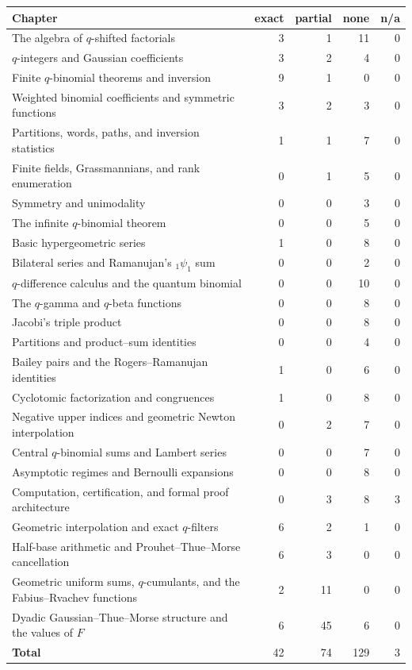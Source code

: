 \documentclass[11pt,a4paper,oneside,openany]{book}
\theoremstyle{definition}
\theoremstyle{remark}
\newcommand{\statusexact}{\textsf{\color{statusgreen}exact}}
\newcommand{\statuspartial}{\textsf{\color{statusamber}partial}}
\newcommand{\statusnone}{\textsf{\color{statusred}none}}
\newcommand{\statusna}{\textsf{n/a}}
\begin{document}
\begin{center}
\begin{tabular}{@{}p{}rrrr@{}}
\toprule
Chapter & \statusexact & \statuspartial & \statusnone & \statusna\\
\midrule
The algebra of $q$-shifted factorials & 3 & 1 & 11 & 0\\
$q$-integers and Gaussian coefficients & 3 & 2 & 4 & 0\\
Finite $q$-binomial theorems and inversion & 9 & 1 & 0 & 0\\
Weighted binomial coefficients and symmetric functions & 3 & 2 & 3 & 0\\
Partitions, words, paths, and inversion statistics & 1 & 1 & 7 & 0\\
Finite fields, Grassmannians, and rank enumeration & 0 & 1 & 5 & 0\\
Symmetry and unimodality & 0 & 0 & 3 & 0\\
The infinite $q$-binomial theorem & 0 & 0 & 5 & 0\\
Basic hypergeometric series & 1 & 0 & 8 & 0\\
Bilateral series and Ramanujan's \texorpdfstring{${}_1\psi_1$}{1psi1} sum & 0 & 0 & 2 & 0\\
$q$-difference calculus and the quantum binomial & 0 & 0 & 10 & 0\\
The $q$-gamma and $q$-beta functions & 0 & 0 & 8 & 0\\
Jacobi's triple product & 0 & 0 & 8 & 0\\
Partitions and product--sum identities & 0 & 0 & 4 & 0\\
Bailey pairs and the Rogers--Ramanujan identities & 1 & 0 & 6 & 0\\
Cyclotomic factorization and congruences & 1 & 0 & 8 & 0\\
Negative upper indices and geometric Newton interpolation & 0 & 2 & 7 & 0\\
Central $q$-binomial sums and Lambert series & 0 & 0 & 7 & 0\\
Asymptotic regimes and Bernoulli expansions & 0 & 0 & 8 & 0\\
Computation, certification, and formal proof architecture & 0 & 3 & 8 & 3\\
Geometric interpolation and exact $q$-filters & 6 & 2 & 1 & 0\\
Half-base arithmetic and Prouhet--Thue--Morse cancellation & 6 & 3 & 0 & 0\\
Geometric uniform sums, $q$-cumulants, and the Fabius--Rvachev functions & 2 & 11 & 0 & 0\\
Dyadic Gaussian--Thue--Morse structure and the values of $F$ & 6 & 45 & 6 & 0\\
\midrule
\textbf{Total} & 42 & 74 & 129 & 3\\
\bottomrule
\end{tabular}
\end{center}
\end{document}
